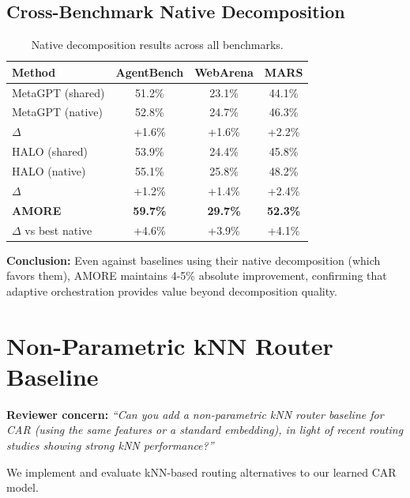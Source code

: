 \documentclass{article}
\theoremstyle{plain}
\theoremstyle{definition}
\theoremstyle{remark}
\begin{document}
\subsection{Cross-Benchmark Native Decomposition}

\begin{table}[h]
\centering
\caption{Native decomposition results across all benchmarks.}
\label{tab:native-all}
\small
\begin{tabular}{lccc}
\toprule
\textbf{Method} & \textbf{AgentBench} & \textbf{WebArena} & \textbf{MARS} \\
\midrule
MetaGPT (shared) & 51.2\% & 23.1\% & 44.1\% \\
MetaGPT (native) & 52.8\% & 24.7\% & 46.3\% \\
$\Delta$ & +1.6\% & +1.6\% & +2.2\% \\
\midrule
HALO (shared) & 53.9\% & 24.4\% & 45.8\% \\
HALO (native) & 55.1\% & 25.8\% & 48.2\% \\
$\Delta$ & +1.2\% & +1.4\% & +2.4\% \\
\midrule
\textbf{AMORE} & \textbf{59.7\%} & \textbf{29.7\%} & \textbf{52.3\%} \\
$\Delta$ vs best native & +4.6\% & +3.9\% & +4.1\% \\
\bottomrule
\end{tabular}
\end{table}

\textbf{Conclusion:} Even against baselines using their native decomposition (which favors them), AMORE maintains 4-5\% absolute improvement, confirming that adaptive orchestration provides value beyond decomposition quality.

\section{Non-Parametric kNN Router Baseline}
\label{app:knn-router}

\textbf{Reviewer concern:} \textit{``Can you add a non-parametric kNN router baseline for CAR (using the same features or a standard embedding), in light of recent routing studies showing strong kNN performance?''}

We implement and evaluate kNN-based routing alternatives to our learned CAR model.
\end{document}
